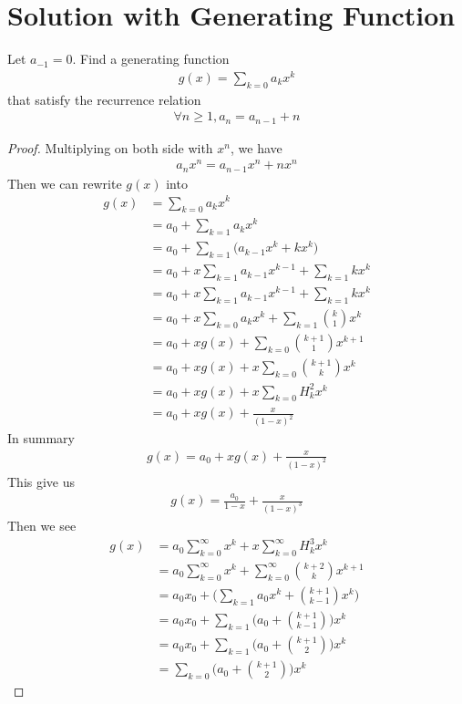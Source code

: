 \documentclass{report}
\begin{document}
\section{Solution with Generating Function}
\begin{question}{}{}
Let $a_{-1}=0$. Find a generating function
\begin{align*}
g(x)=\sum_{k=0}a_k x^k
\end{align*}
that satisfy the recurrence relation 
\begin{align}
\label{eq1}\forall n\geq 1,a_n=a_{n-1}+n
\end{align}
\end{question}
\begin{proof}
Multiplying  on both side with $x^n$, we have
\begin{align*}
a_nx^n=a_{n-1}x^n +nx^n
\end{align*}
Then we can rewrite $g(x)$ into 
\begin{align*}
g(x)&=\sum_{k=0}a_kx^k\\
&=a_0 +\sum_{k=1}a_kx^k\\
&=a_0 +\sum_{k=1}\big(a_{k-1}x^k+kx^k\big)\\
&=a_0+x\sum_{k=1}a_{k-1}x^{k-1} + \sum_{k=1} kx^k\\
&=a_0+x\sum _{k=1}a_{k-1}x^{k-1} +\sum_{k=1} kx^k\\
&=a_0+x\sum_{k=0}a_kx^k+\sum_{k=1} \binom{k}{1}x^k\\
&=a_0+xg(x)+\sum_{k=0}\binom{k+1}{1}x^{k+1}\\
&=a_0+xg(x)+ x\sum_{k=0} \binom{k+1}{k}x^k\\
&=a_0+xg(x)+x \sum_{k=0} H^2_k x^k\\
&=a_0+x g(x)+\frac{x}{(1-x)^2}
\end{align*}
In summary 
\begin{align*}
g(x)=a_0+xg(x)+\frac{x}{(1-x)^2}
\end{align*}
This give us 
\begin{align*}
g(x)=\frac{a_0}{1-x}+\frac{x}{(1-x)^3}
\end{align*}
Then we see 
\begin{align*}
g(x)&=a_0 \sum_{k=0}^\infty x^k+x \sum_{k=0}^\infty H^3_k x^k\\
&=a_0\sum _{k=0}^\infty x^k + \sum_{k=0}^\infty \binom{k+2}{k}x^{k+1}\\\
&=a_0 x_0 +\big(\sum_{k=1} a_0x^k+ \binom{k+1}{k-1}x^k\big)\\
&=a_0x_0+\sum_{k=1} \big (a_0+\binom{k+1}{k-1}\big)x^k\\
&=a_0x_0+\sum_{k=1} \big(a_0+\binom{k+1}{2}\big)x^k\\
&=\sum_{k=0} \big(a_0+\binom{k+1}{2})x^k
\end{align*}
\end{proof}
\end{document}
